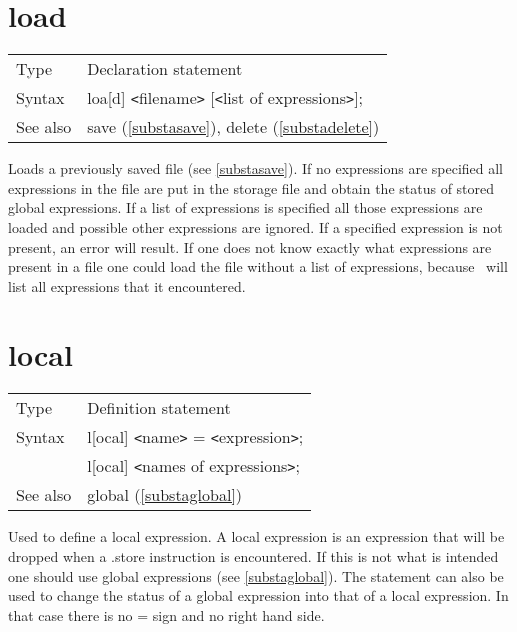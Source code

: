 
\section{load}
\label{substaload}

\noindent \begin{tabular}{ll}
Type & Declaration statement\\
Syntax & loa[d] {\tt<}filename{\tt>} [{\tt<}list of expressions{\tt>}];
\\ See also & save (\ref{substasave}), delete (\ref{substadelete})
\end{tabular} \vspace{4mm}

\noindent Loads a previously saved 
file (see \ref{substasave}). If no expressions are 
specified all expressions in the file are put in the storage 
file and obtain the status of stored global 
expressions. If a list of expressions is specified all those expressions 
are loaded and possible other expressions are ignored. If a specified 
expression is not present, an error will result. If one does not know 
exactly what expressions are present in a file one could load the file 
without a list of expressions, because \FORM\ will list all expressions that 
it encountered. \vspace{10mm}

 
\section{local}
\label{substalocal}

\noindent \begin{tabular}{ll}
Type & Definition statement\\
Syntax & l[ocal] {\tt<}name{\tt>} = {\tt<}expression{\tt>}; \\
       & l[ocal] {\tt<}names of expressions{\tt>};
\\ See also & global (\ref{substaglobal})
\end{tabular} \vspace{4mm}

\noindent Used to define a local expression. A local 
expression is an expression that will be dropped when a 
.store instruction is encountered. If this is not what is 
intended one should use global expressions (see 
\ref{substaglobal}). The statement can also be used to change the status of 
a global expression into that of a local expression. In that case there is 
no = sign and no right hand side. \vspace{10mm}

